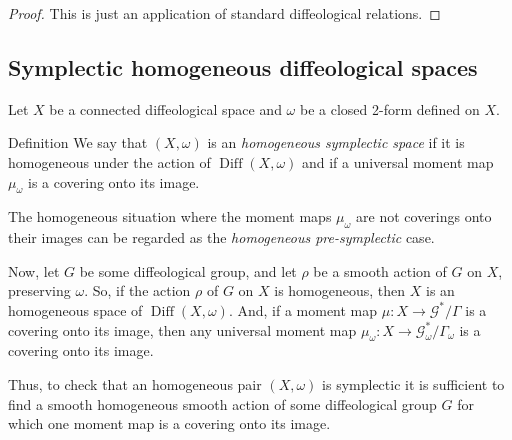\documentclass[10pt,reqno,twoside]{amsart}
\newcommand{\cG}{\mathcal{G}}
\DeclareMathOperator{\Diff}{Diff}
\theoremstyle{plain}
\theoremstyle{definition}
\newcommand{\article}[1]{\subsection{#1}}
\begin{document}
  \begin{proof}
    This is just an application of standard diffeological relations.
  \end{proof}
  
  \article{Symplectic homogeneous diffeological spaces}
  \label{Symplectic-homogeneous-diffeological-spaces}
  Let $X$ be a connected diffeological space and $\omega$ be a closed 2-form defined on $X$.
  
  {\sc Definition} We say that $(X,\omega)$ is an {\em homogeneous symplectic space} if it is homogeneous under the action of $\Diff(X,\omega)$ and if a universal moment map $\mu_\omega$ is a covering onto its image.
  
  The homogeneous situation where the moment maps $\mu_\omega$ are not coverings onto their images can be regarded as the {\em homogeneous pre-symplectic} case.
  
  Now,
  let $G$ be some diffeological group,
  and let $\rho$ be a smooth action of $G$ on $X$,
  preserving $\omega$.
  So,
  if the action $\rho$ of $G$ on $X$ is homogeneous,
  then $X$ is an homogeneous space of $\Diff(X,\omega)$.
  And,
  if a moment map $\mu : X \to \cG^*\!/\Gamma$ is a covering onto its image,
  then any universal moment map $\mu_\omega : X \to \cG^*_\omega/\Gamma_\omega$ is a covering onto its image.
  
  Thus,
  to check that an homogeneous pair $(X,\omega)$ is symplectic it is sufficient to find a smooth homogeneous smooth action of some diffeological group $G$ for which one moment map is a covering onto its image.
  
\end{document}
